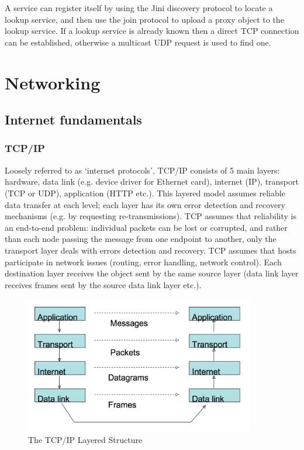 \documentclass[a4paper,oneside]{report}
\begin{document}
      	 	A service can register itself by using the Jini discovery protocol to locate a lookup service, and then use the join protocol to upload a proxy object to the lookup service. If a lookup service is already known then a direct TCP connection can be established, otherwise a multicast UDP request is used to find one.
      	 	  		
\chapter{Networking}

	\section{Internet fundamentals}
 	
    	\subsection{TCP/IP}
    	Loosely referred to as `internet protocols', TCP/IP consists of 5 main layers: hardware, data link (e.g. device driver for Ethernet card), internet (IP), transport (TCP or UDP), application (HTTP etc.). This layered model assumes reliable data transfer at each level; each layer has its own error detection and recovery mechanisms (e.g. by requesting re-transmissions). TCP assumes that reliability is an end-to-end problem: individual packets can be lost or corrupted, and rather than each node passing the message from one endpoint to another, only the transport layer deals with errors detection and recovery. TCP assumes that hosts participate in network issues (routing, error handling, network control). Each destination layer receives the object sent by the same source layer (data link layer receives frames sent by the source data link layer etc.).
    	
    	\begin{figure}[h!]
    	    \begin{center}
    		\includegraphics[width=100mm]{layering.png}
    		\caption{The TCP/IP Layered Structure}
    		\end{center}
    	\end{figure}
    	
\end{document}

